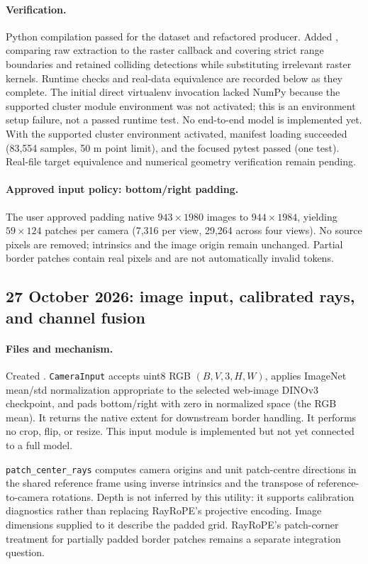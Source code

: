 \documentclass[11pt,a4paper]{article}
\begin{document}
\paragraph{Verification.}
Python compilation passed for the dataset and refactored producer. Added , comparing raw extraction to the raster callback and covering strict range boundaries and retained colliding detections while substituting irrelevant raster kernels. Runtime checks and real-data equivalence are recorded below as they complete. The initial direct virtualenv invocation lacked NumPy because the supported cluster module environment was not activated; this is an environment setup failure, not a passed runtime test. No end-to-end model is implemented yet. With the supported cluster environment activated, manifest loading succeeded (83,554 samples, 50 m point limit), and the focused pytest passed (one test). Real-file target equivalence and numerical geometry verification remain pending.

\paragraph{Approved input policy: bottom/right padding.}
The user approved padding native $943\times1980$ images to $944\times1984$, yielding $59\times124$ patches per camera (7,316 per view, 29,264 across four views). No source pixels are removed; intrinsics and the image origin remain unchanged. Partial border patches contain real pixels and are not automatically invalid tokens.

\subsection{27 October 2026: image input, calibrated rays, and channel fusion}
\paragraph{Files and mechanism.}
Created . \texttt{CameraInput} accepts uint8 RGB $(B,V,3,H,W)$, applies ImageNet mean/std normalization appropriate to the selected web-image DINOv3 checkpoint, and pads bottom/right with zero in normalized space (the RGB mean). It returns the native extent for downstream border handling. It performs no crop, flip, or resize. This input module is implemented but not yet connected to a full model.

\texttt{patch\_center\_rays} computes camera origins and unit patch-centre directions in the shared reference frame using inverse intrinsics and the transpose of reference-to-camera rotations. Depth is not inferred by this utility: it supports calibration diagnostics rather than replacing RayRoPE's projective encoding. Image dimensions supplied to it describe the padded grid. RayRoPE's patch-corner treatment for partially padded border patches remains a separate integration question.
\end{document}
